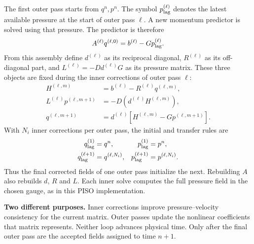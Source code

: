The first outer pass starts from $q^n,p^n$. The symbol $p_{\rm lag}^{(\ell)}$ denotes the latest available pressure at the start of outer pass $\ell$. A new momentum predictor is solved using that pressure. The predictor is therefore
\[
A^{(\ell)}q^{(\ell,0)}=b^{(\ell)}-Gp_{\rm lag}^{(\ell)}.
\]
\newpage
{}
From this assembly define $d^{(\ell)}$ as its reciprocal diagonal, $R^{(\ell)}$ as its off-diagonal part, and $L^{(\ell)}=-D d^{(\ell)}G$ as its pressure matrix. These three objects are fixed during the inner corrections of outer pass $\ell$:
\begin{align*}
H^{(\ell,m)}&=b^{(\ell)}-R^{(\ell)}q^{(\ell,m)},\\
L^{(\ell)}p^{(\ell,m+1)}&=-D\left(d^{(\ell)}H^{(\ell,m)}\right),\\
q^{(\ell,m+1)}&=d^{(\ell)}\left[H^{(\ell,m)}-Gp^{(\ell,m+1)}\right].
\end{align*}
With $N_i$ inner corrections per outer pass, the initial and transfer rules are
\begin{align*}
q_{\rm lag}^{(1)}&=q^n,&p_{\rm lag}^{(1)}&=p^n,\\
q_{\rm lag}^{(\ell+1)}&=q^{(\ell,N_i)},&p_{\rm lag}^{(\ell+1)}&=p^{(\ell,N_i)}.
\end{align*}
Thus the final corrected fields of one outer pass initialize the next. Rebuilding $A$ also rebuilds $d$, $R$ and $L$. Each inner solve computes the full pressure field in the chosen gauge, as in this PISO implementation.

\textbf{Two different purposes.} Inner corrections improve pressure--velocity consistency for the current matrix. Outer passes update the nonlinear coefficients that matrix represents. Neither loop advances physical time. Only after the final outer pass are the accepted fields assigned to time $n+1$.

